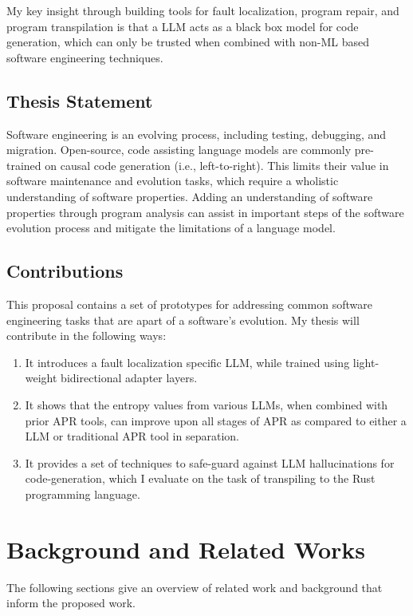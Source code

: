 \documentclass[12pt,openany,oneside,table]{cmuthesis}
\begin{document}
My key insight through building tools for fault localization, program repair, and program transpilation is that a LLM acts as a black box model for code generation, which can only be trusted when combined with non-ML based software engineering techniques.

\section{Thesis Statement}

Software engineering is an evolving process, including testing, debugging, and migration. Open-source, code assisting language models are commonly pre-trained on causal code generation (i.e., left-to-right). This limits their value in software maintenance and evolution tasks, which require a wholistic understanding of software properties. Adding an understanding of software properties through program analysis can assist in important steps of the software evolution process and mitigate the limitations of a language model.

\section{Contributions}

This proposal contains a set of prototypes for addressing common software engineering tasks that are apart of a software's evolution.
My thesis will contribute in the following ways:
\begin{enumerate}
\item
It introduces a fault localization specific LLM, while trained using light-weight bidirectional adapter layers.
\item
It shows that the entropy values from various LLMs, when combined with prior APR tools, can improve upon all stages of APR as compared to either a LLM or traditional APR tool in separation.
\item
It provides a set of techniques to safe-guard against LLM hallucinations for code-generation, which I evaluate on the task of transpiling to the Rust programming language.
\end{enumerate}




\chapter{Background and Related Works}
\label{ch:background}

The following sections give an overview of related work and background
that inform the proposed work.
\end{document}
